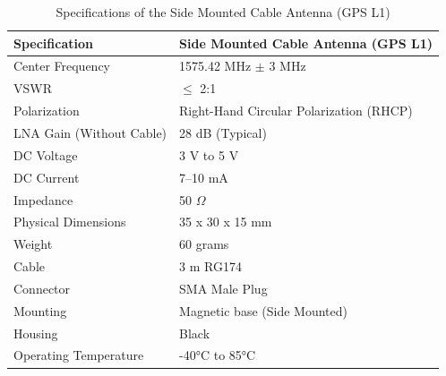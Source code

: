 \documentclass[12pt,letter]{article}
\begin{document}
\begin{table}[h!]
    \centering
    \begin{tabular}{ll}
        \toprule
        \textbf{Specification} & \textbf{Side Mounted Cable Antenna (GPS L1)} \\
        \midrule
        Center Frequency & 1575.42 MHz $\pm$ 3 MHz \\
        VSWR & $\leq$ 2:1 \\
        Polarization & Right-Hand Circular Polarization (RHCP) \\
        LNA Gain (Without Cable) & 28 dB (Typical) \\
        DC Voltage & 3 V to 5 V \\
        DC Current & 7--10 mA \\
        Impedance & 50 $\Omega$ \\
        Physical Dimensions & 35 x 30 x 15 mm \\
        Weight & 60 grams \\
        Cable & 3 m RG174 \\
        Connector & SMA Male Plug \\
        Mounting & Magnetic base (Side Mounted) \\
        Housing & Black \\
        Operating Temperature & -40°C to 85°C \\
        \bottomrule
    \end{tabular}
    \caption{Specifications of the Side Mounted Cable Antenna (GPS L1)}
    \label{tab:side_mounted_antenna}
\end{table}
\end{document}
